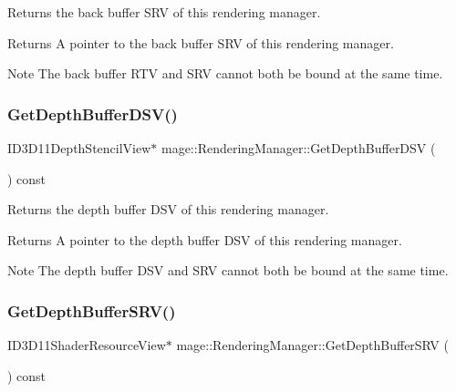 Returns the back buffer S\+RV of this rendering manager.

\begin{DoxyReturn}{Returns}
A pointer to the back buffer S\+RV of this rendering manager. 
\end{DoxyReturn}
\begin{DoxyNote}{Note}
The back buffer R\+TV and S\+RV cannot both be bound at the same time. 
\end{DoxyNote}
\hypertarget{classmage_1_1_rendering_manager_a7c90cf73b8b8afd4fe6018bde7926cd2}{}\label{classmage_1_1_rendering_manager_a7c90cf73b8b8afd4fe6018bde7926cd2} 
\subsubsection{\texorpdfstring{Get\+Depth\+Buffer\+D\+S\+V()}{GetDepthBufferDSV()}}
{\footnotesize\ttfamily I\+D3\+D11\+Depth\+Stencil\+View$\ast$ mage\+::\+Rendering\+Manager\+::\+Get\+Depth\+Buffer\+D\+SV (\begin{DoxyParamCaption}{ }\end{DoxyParamCaption}) const\hspace{0.3cm}{\ttfamily [noexcept]}}

Returns the depth buffer D\+SV of this rendering manager.

\begin{DoxyReturn}{Returns}
A pointer to the depth buffer D\+SV of this rendering manager. 
\end{DoxyReturn}
\begin{DoxyNote}{Note}
The depth buffer D\+SV and S\+RV cannot both be bound at the same time. 
\end{DoxyNote}
\hypertarget{classmage_1_1_rendering_manager_a703a1b27fb1523c2c2796a1dcd6e63d9}{}\label{classmage_1_1_rendering_manager_a703a1b27fb1523c2c2796a1dcd6e63d9} 
\subsubsection{\texorpdfstring{Get\+Depth\+Buffer\+S\+R\+V()}{GetDepthBufferSRV()}}
{\footnotesize\ttfamily I\+D3\+D11\+Shader\+Resource\+View$\ast$ mage\+::\+Rendering\+Manager\+::\+Get\+Depth\+Buffer\+S\+RV (\begin{DoxyParamCaption}{ }\end{DoxyParamCaption}) const\hspace{0.3cm}{\ttfamily [noexcept]}}

